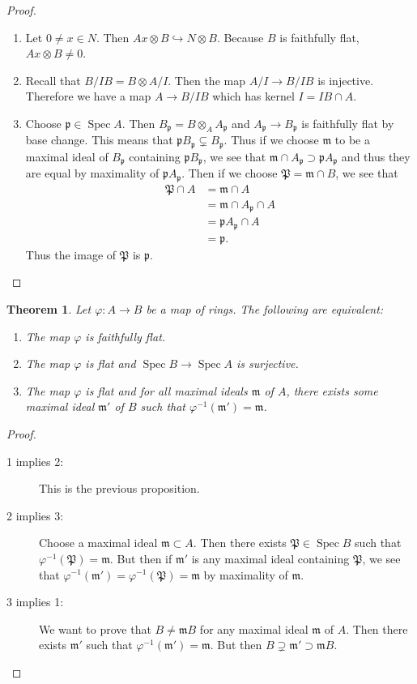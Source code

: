 \documentclass[leqno, openany]{memoir}
\newtheorem{thm}{Theorem}[section]
\theoremstyle{definition}
\theoremstyle{remark}
\theoremstyle{plain}
\theoremstyle{definition}
\theoremstyle{remark}
\newcommand{\mf}[1]{\mathfrak{#1}}
\DeclareMathOperator{\Spec}{Spec}
\begin{document}
\begin{proof} \begin{enumerate} \item Let $0 \neq x \in N$. Then $Ax \otimes B
    \hookrightarrow N \otimes B$. Because $B$ is faithfully flat, $Ax \otimes B
    \neq 0$.  \item Recall that $B/IB = B \otimes A/I$. Then the map $A/I \to
    B/IB$ is injective. Therefore we have a map $A \to B/IB$ which has kernel
    $I = IB \cap A$.  \item Choose $\mf{p} \in \Spec A$. Then $B_{\mf{p}} = B
    \otimes_A A_{\mf{p}}$ and $A_{\mf{p}} \to B_{\mf{p}}$ is faithfully flat by
    base change. This means that $\mf{p} B_{\mf{p}} \subsetneq B_{\mf{p}}$.
    Thus if we choose $\mf{m}$ to be a maximal ideal of $B_{\mf{p}}$ containing
    $\mf{p} B_{\mf{p}}$, we see that $\mf{m} \cap A_{\mf{p}} \supset
    \mf{p}A_{\mf{p}}$ and thus they are equal by maximality of
    $\mf{p}A_{\mf{p}}$. Then if we choose $\mf{P} = \mf{m} \cap B$, we see that
    \begin{align*} \mf{P} \cap A &= \mf{m} \cap A \\ &= \mf{m} \cap A_{\mf{p}}
    \cap A \\ &= \mf{p} A_{\mf{p}} \cap A \\ &= \mf{p}.  \end{align*} Thus the
    image of $\mf{P}$ is $\mf{p}$. \qedhere \end{enumerate} \end{proof}

\begin{thm} Let $\varphi: A \to B$ be a map of rings. The following are
    equivalent: \begin{enumerate} \item The map $\varphi$ is faithfully flat.
        \item The map $\varphi$ is flat and $\Spec B \to \Spec A$ is
            surjective.  \item The map $\varphi$ is flat and for all maximal
            ideals $\mf{m}$ of $A$, there exists some maximal ideal $\mf{m}'$
            of $B$ such that $\varphi^{-1}(\mf{m}') = \mf{m}$.  \end{enumerate}
        \end{thm}

\begin{proof} \begin{description} \item[1 implies 2:] This is the previous
    proposition.  \item[2 implies 3:] Choose a maximal ideal $\mf{m} \subset
    A$. Then there exists $\mf{P} \in \Spec B$ such that $\varphi^{-1}(\mf{P})
    = \mf{m}$. But then if $\mf{m}'$ is any maximal ideal containing $\mf{P}$,
    we see that $\varphi^{-1}(\mf{m}') = \varphi^{-1}(\mf{P}) = \mf{m}$ by
    maximality of $\mf{m}$.  \item[3 implies 1:] We want to prove that $B \neq
    \mf{m}B$ for any maximal ideal $\mf{m}$ of $A$. Then there exists $\mf{m}'$
    such that $\varphi^{-1}(\mf{m}') = \mf{m}$. But then $B \supsetneq \mf{m}'
    \supset \mf{m}B$. \qedhere \end{description} \end{proof}
\end{document}

